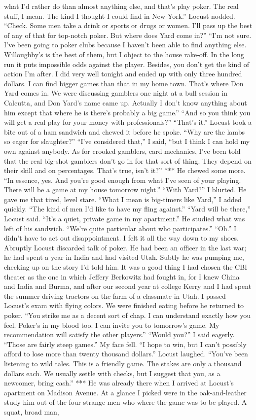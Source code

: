 \documentclass{novel}
\begin{document}
what I’d rather do than almost anything else, and that’s play poker. The real stuff, I mean. The kind I thought I could find in New York.” Locust nodded. “Check. Some men take a drink or sports or drugs or women. I’ll pass up the best of any of that for top-notch poker. But where does Yard come in?” “I’m not sure. I’ve been going to poker clubs because I haven’t been able to find anything else. Willoughby’s is the best of them, but I object to the house rake-off. In the long run it puts impossible odds against the player. Besides, you don’t get the kind of action I’m after. I did very well tonight and ended up with only three hundred dollars. I can find bigger games than that in my home town. That’s where Don Yard comes in. We were discussing gamblers one night at a bull session in Calcutta, and Don Yard’s name came up. Actually I don’t know anything about him except that where he is there’s probably a big game.” “And so you think you will get a real play for your money with professionals?” “That’s it.” Locust took a bite out of a ham sandwich and chewed it before he spoke. “Why are the lambs so eager for slaughter?” “I’ve considered that,” I said, “but I think I can hold my own against anybody. As for crooked gamblers, card mechanics, I’ve been told that the real big-shot gamblers don’t go in for that sort of thing. They depend on their skill and on percentages. That’s true, isn’t it?” *** He chewed some more. “In essence, yes. And you’re good enough from what I’ve seen of your playing. There will be a game at my house tomorrow night.” “With Yard?” I blurted. He gave me that tired, level stare. “What I mean is big-timers like Yard,” I added quickly. “The kind of men I’d like to have my fling against.” “Yard will be there,” Locust said. “It’s a quiet, private game in my apartment.” He studied what was left of his sandwich. “We’re quite particular about who participates.” “Oh.” I didn’t have to act out disappointment. I felt it all the way down to my shoes. Abruptly Locust discarded talk of poker. He had been an officer in the last war; he had spent a year in India and had visited Utah. Subtly he was pumping me, checking up on the story I’d told him. It was a good thing I had chosen the CBI theater as the one in which Jeffery Berkowitz had fought in, for I knew China and India and Burma, and after our second year at college Kerry and I had spent the summer driving tractors on the farm of a classmate in Utah. I passed Locust’s exam with flying colors. We were finished eating before he returned to poker. “You strike me as a decent sort of chap. I can understand exactly how you feel. Poker’s in my blood too. I can invite you to tomorrow’s game. My recommendation will satisfy the other players.” “Would you?” I said eagerly. “Those are fairly steep games.” My face fell. “I hope to win, but I can’t possibly afford to lose more than twenty thousand dollars.” Locust laughed. “You’ve been listening to wild tales. This is a friendly game. The stakes are only a thousand dollars each. We usually settle with checks, but I suggest that you, as a newcomer, bring cash.” *** He was already there when I arrived at Locust’s apartment on Madison Avenue. At a glance I picked were in the oak-and-leather study him out of the four strange men who where the game was to be played. A squat, broad man, 
\end{document}
